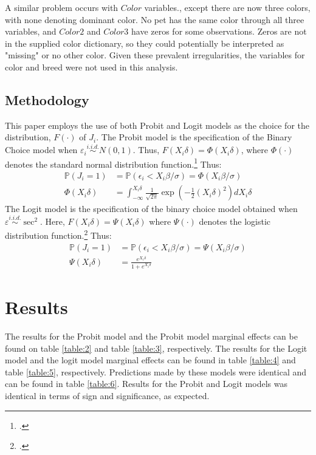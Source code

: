 \documentclass[12pt]{article}
\newcommand{\Prob}{\mathbb{P}}
\begin{document}
		A similar problem occurs with $ Color $ variables., except there are now three colors, with none denoting dominant color. No pet has the same color through all three variables, and $ Color2 $ and $ Color3 $ have zeros for some observations. Zeros are not in the supplied color dictionary, so they could potentially be interpreted as "missing" or no other color. Given these prevalent irregularities, the variables for color and breed were not used in this analysis.
		
		\subsection{Methodology}
		
		This paper employs the use of both Probit and Logit models as the choice for the distribution, $ F(\cdot) $ of $ J_i $. The Probit model is the specification of the Binary Choice model when $ \varepsilon_i \overset{i.i.d.}{\sim}N(0,1) $. Thus, $ F(X_i\delta)=\Phi(X_i\delta) $, where $ \Phi(\cdot) $ denotes the standard normal distribution function.\footcite{BCM} Thus:
		\begin{align}
		\Prob\left(J_{i}=1\right)&=\Prob\left(\epsilon_{i}<X_{i} \beta / \sigma\right)=\Phi\left(X_{i} \beta / \sigma\right)\\
		\Phi(X_i\delta)&=\int_{-\infty}^{X_i\delta} \frac{1}{ \sqrt{2\pi} } \exp\left( -\frac{1}{2} (X_i\delta)^2 \right) dX_i\delta \nonumber
		\end{align}
		The Logit model is the specification of the binary choice model obtained when $ \varepsilon\overset{i.i.d.}{\sim}\sec^2 $. Here, $ F(X_i\delta)=\Psi(X_i\delta) $ where $ \Psi(\cdot) $ denotes the logistic distribution function.\footcite{BCM} Thus:
		\begin{align}
		\Prob\left(J_{i}=1\right)&=\Prob\left(\epsilon_{i}<X_{i} \beta / \sigma\right)=\Psi\left(X_{i} \beta / \sigma\right)\\
		\Psi(X_i\delta)&=\frac{ e^{X_i\delta} }{ 1+e^{X_i\delta} } \nonumber
		\end{align}
		
		
	\section{Results}
		The results for the Probit model and the Probit model marginal effects can be found on table \ref{table:2} and table \ref{table:3}, respectively. The results for the Logit model and the logit model marginal effects can be found in table \ref{table:4} and table \ref{table:5}, respectively. Predictions made by these models were identical and can be found in table \ref{table:6}. Results for the Probit and Logit models was identical in terms of sign and significance, as expected. 
		
\end{document}
